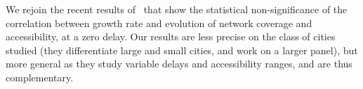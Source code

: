 

We rejoin the recent results of~\cite{mimeur:hal-01616746} that show the statistical non-significance of the correlation between growth rate and evolution of network coverage and accessibility, at a zero delay. Our results are less precise on the class of cities studied (they differentiate large and small cities, and work on a larger panel), but more general as they study variable delays and accessibility ranges, and are thus complementary.


